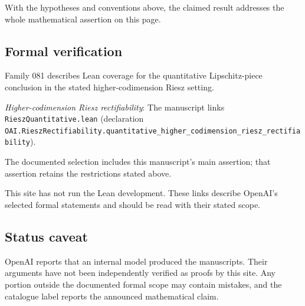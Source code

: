 \documentclass[11pt]{article}
\begin{document}
With the hypotheses and conventions above, the claimed result addresses the whole mathematical assertion on this page.

\subsection{Formal verification}
Family 081 describes Lean coverage for the quantitative Lipschitz-piece conclusion in the stated higher-codimension Riesz setting.

\textit{Higher-codimension Riesz rectifiability}: The manuscript links \texttt{RieszQuantitative.lean} (declaration \texttt{OAI.RieszRectifiability.quantitative\_higher\_codimension\_riesz\_rectifiability}).

The documented selection includes this manuscript’s main assertion; that assertion retains the restrictions stated above.

This site has not run the Lean development. These links describe OpenAI’s selected formal statements and should be read with their stated scope.

\subsection{Status caveat}
OpenAI reports that an internal model produced the manuscripts. Their arguments have not been independently verified as proofs by this site. Any portion outside the documented formal scope may contain mistakes, and the catalogue label reports the announced mathematical claim.
\end{document}
